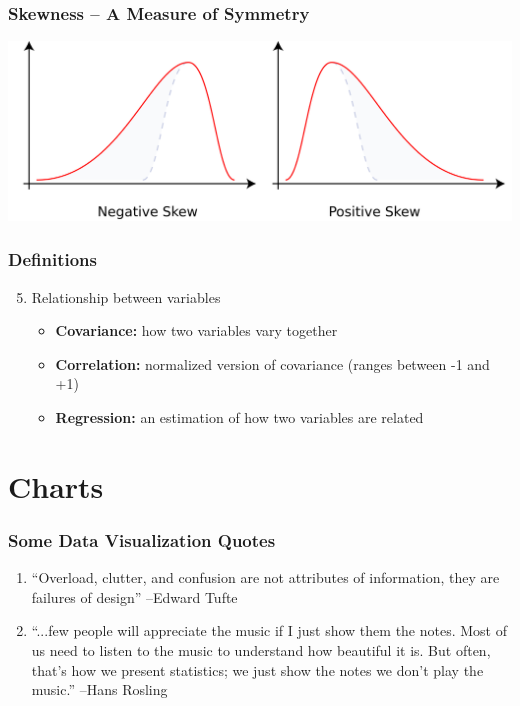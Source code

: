 \documentclass{beamer}
\begin{document}
 \begin{frame}
 \frametitle{Skewness -- A Measure of Symmetry}
    \centering
    \includegraphics[scale=0.15]{./images/skew.png}
 \end{frame}

\begin{frame}
\frametitle{Definitions}
	\begin{enumerate}
	\setcounter{enumi}{4}
		\item Relationship between variables
		\begin{itemize}
			\item \textbf{Covariance:} how two variables vary together
			\item \textbf{Correlation:} normalized version of covariance (ranges between -1 and +1)
			\item \textbf{Regression:} an estimation of how two variables are related
		\end{itemize}
	\end{enumerate}
\end{frame}

\section{Charts}
\begin{frame}
\frametitle{Some Data Visualization Quotes}
	\begin{enumerate}
		\item ``Overload, clutter, and confusion are not attributes of information, they are failures 			of design'' --Edward Tufte
		
		\medskip
		
		\item ``...few people will appreciate the music if I just show them the notes. Most of us 				need to listen to the music to understand how beautiful it is. But often, that's how we 				present statistics; we just show the notes we don't play the music.'' --Hans Rosling
	\end{enumerate}
\end{frame}
\end{document}

